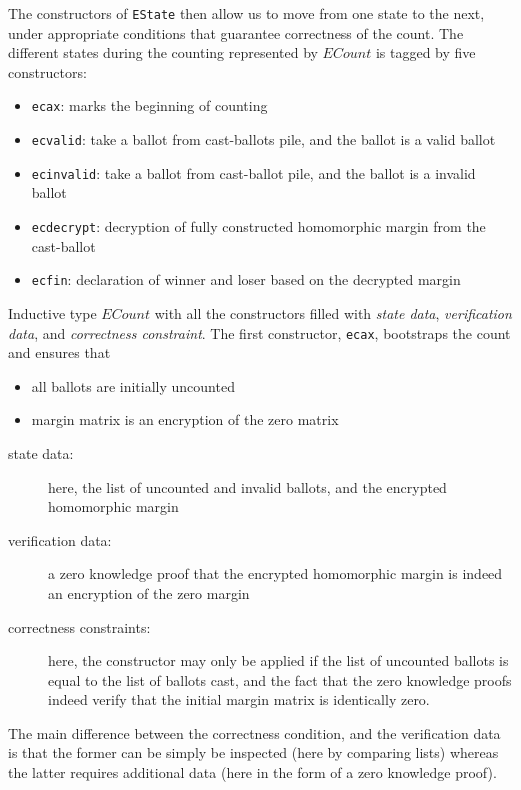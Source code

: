 \noindent
The constructors of \texttt{EState} then allow us to move from one
state to the next, under appropriate conditions that guarantee
correctness of the count. The different states during the 
counting represented by $ECount$ is tagged by five constructors: 
\begin{itemize}
\item \texttt{ecax}: marks the beginning of counting
\item \texttt{ecvalid}: take a ballot from cast-ballots pile, and the ballot is a valid ballot
\item \texttt{ecinvalid}: take a ballot from cast-ballot pile, and the ballot is a invalid ballot
\item \texttt{ecdecrypt}: decryption of fully constructed homomorphic margin from the cast-ballot
\item \texttt{ecfin}: declaration of winner and loser based on the decrypted margin
\end{itemize}

Inductive type $ECount$ with all the constructors filled with \textit{state data}, 
\textit{verification data}, and \textit{correctness constraint}.  The first constructor, \texttt{ecax}, bootstraps
the count and ensures that 
\begin{itemize}
  \item all ballots are initially uncounted
  \item margin matrix is an encryption of the zero matrix
\end{itemize}

\begin{description}
  \item[state data:] here, the list of uncounted and invalid ballots,
  and the encrypted homomorphic margin
  \item[verification data:] a zero knowledge proof that the encrypted
  homomorphic margin is indeed an encryption of the zero margin
  \item[correctness constraints:] here, the constructor may only be applied if
  the list of uncounted ballots is equal to the list of ballots
  cast, and the fact that the zero knowledge proofs indeed verify
  that the initial margin matrix is identically zero.
\end{description}

\noindent
The main difference between the correctness condition, and the
verification data is that the former can be simply be inspected
(here by comparing lists) whereas the latter requires additional
data (here  in the form of a zero knowledge proof).

